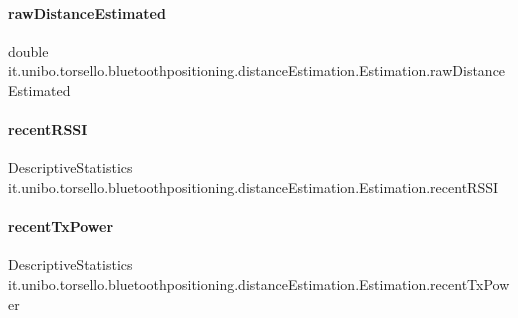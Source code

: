 \paragraph{\texorpdfstring{raw\+Distance\+Estimated}{rawDistanceEstimated}}
{\footnotesize\ttfamily double it.\+unibo.\+torsello.\+bluetoothpositioning.\+distance\+Estimation.\+Estimation.\+raw\+Distance\+Estimated\hspace{0.3cm}{\ttfamily [private]}}

\hypertarget{classit_1_1unibo_1_1torsello_1_1bluetoothpositioning_1_1distanceEstimation_1_1Estimation_a4edd1c580372b087a9d8fc167715088a_a4edd1c580372b087a9d8fc167715088a}{}\label{classit_1_1unibo_1_1torsello_1_1bluetoothpositioning_1_1distanceEstimation_1_1Estimation_a4edd1c580372b087a9d8fc167715088a_a4edd1c580372b087a9d8fc167715088a} 
\paragraph{\texorpdfstring{recent\+R\+S\+SI}{recentRSSI}}
{\footnotesize\ttfamily Descriptive\+Statistics it.\+unibo.\+torsello.\+bluetoothpositioning.\+distance\+Estimation.\+Estimation.\+recent\+R\+S\+SI\hspace{0.3cm}{\ttfamily [private]}}

\hypertarget{classit_1_1unibo_1_1torsello_1_1bluetoothpositioning_1_1distanceEstimation_1_1Estimation_a4258d96e807fa104223635ecb7ddc940_a4258d96e807fa104223635ecb7ddc940}{}\label{classit_1_1unibo_1_1torsello_1_1bluetoothpositioning_1_1distanceEstimation_1_1Estimation_a4258d96e807fa104223635ecb7ddc940_a4258d96e807fa104223635ecb7ddc940} 
\paragraph{\texorpdfstring{recent\+Tx\+Power}{recentTxPower}}
{\footnotesize\ttfamily Descriptive\+Statistics it.\+unibo.\+torsello.\+bluetoothpositioning.\+distance\+Estimation.\+Estimation.\+recent\+Tx\+Power\hspace{0.3cm}{\ttfamily [private]}}

